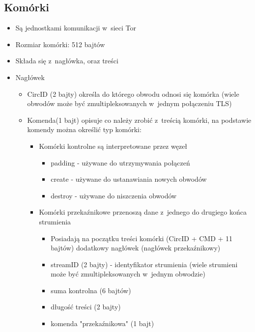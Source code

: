 \subsection{Komórki}
   \begin{itemize}
    \item Są jednostkami komunikacji w~sieci Tor
    \item Rozmiar komórki: 512 bajtów
    \item Składa się z~nagłówka, oraz treści
    \item Nagłówek
    \begin{itemize}
     \item CircID (2 bajty) określa do którego obwodu odnosi się komórka (wiele obwodów może być zmultipleksowanych w~jednym połączeniu TLS)
     \item Komenda(1 bajt) opisuje co należy zrobić z~treścią komórki, na podstawie komendy można określić typ komórki:
     \begin{itemize}
      \item Komórki kontrolne są interpretowane przez węzeł
      \begin{itemize}
       \item padding - używane do utrzymywania połączeń
       \item create - używane do ustanawiania nowych obwodów
       \item destroy - używane do niszczenia obwodów
      \end{itemize}

      \item Komórki przekaźnikowe przenoszą dane z~jednego do drugiego końca strumienia
      \begin{itemize}
       \item Posiadają na początku treści komórki (CircID + CMD + 11 bajtów) dodatkowy nagłówek (nagłówek przekaźnikowy)
       \item streamID (2 bajty) - identyfikator strumienia (wiele strumieni może być zmultipleksowanych w~jednym obwodzie)
       \item suma kontrolna (6 bajtów)
       \item długość treści (2 bajty)
       \item komenda "przekaźnikowa" (1 bajt)
      \end{itemize}

     \end{itemize}

    \end{itemize}

   \end{itemize}

